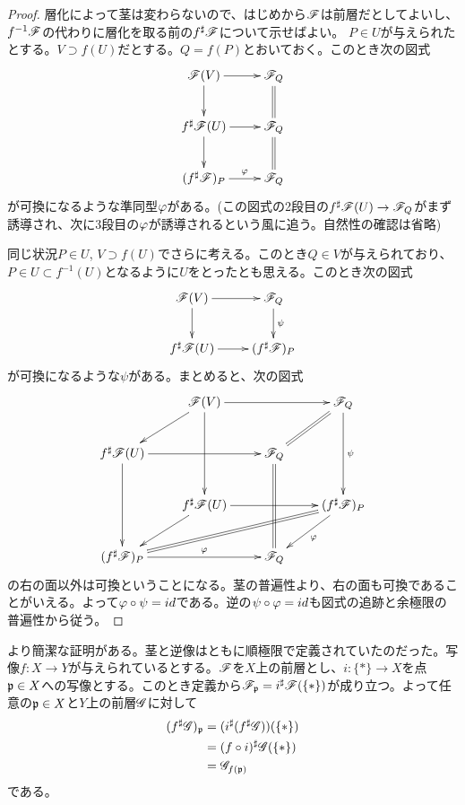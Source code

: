 \begin{proof}
  層化によって茎は変わらないので、はじめから$\mathscr{F}$は前層だとしてよいし、$f^{-1}\mathscr{F}$の代わりに層化を取る前の$f^{\sharp}\mathscr{F}$について示せばよい。
  $P \in U$が与えられたとする。$V \supset f(U)$だとする。$Q = f(P)$とおいておく。このとき次の図式
\[
\xymatrix{
\scrf(V) \ar[r] \ar[d] & \scrf_Q \ar@{=}[d] \\
f\sh\scrf(U) \ar[d] \ar[r] & \scrf_Q \ar@{=}[d] \\
(f\sh\scrf)_P \ar[r]^-{\vp} & \scrf_Q
}
\]
  が可換になるような準同型${\varphi}$がある。(この図式の2段目の$f^{\sharp}\mathscr{F}(U) \to \mathscr{F}_Q$がまず誘導され、次に3段目の${\varphi}$が誘導されるという風に追う。自然性の確認は省略)

  同じ状況$P \in U$, $V \supset f(U)$でさらに考える。このとき$Q \in V$が与えられており、$P \in U \subset f^{-1}(U)$となるように$U$をとったとも思える。このとき次の図式
  \[
  \xymatrix{
  \scrf(V) \ar[d] \ar[r] & \scrf_Q \ar[d]^-{\psi} \\
f\sh\scrf(U) \ar[r] & (f\sh\scrf)_P
  }
  \]
  が可換になるような$\psi$がある。まとめると、次の図式
  \[
  \xymatrix{
  {}  & \scrf(V) \ar[rr] \ar[ld] \ar[dd] & {} & \scrf_Q \ar@{=}[ld] \ar[dd]^-{\psi} \\
  f\sh\scrf(U) \ar[dd]  \ar[rr] & { } & \scrf_Q \ar@{=}[dd] & {} \\
  {} & f\sh\scrf(U)  \ar[rr] \ar[dl] & { } & (f\sh\scrf )_P \ar@{=}[dlll] \ar[dl]^-{\vp} \\
   (f\sh\scrf )_P  \ar[rr]^-{\vp}  & {} & \scrf_Q & {}
  }
  \]
  の右の面以外は可換ということになる。茎の普遍性より、右の面も可換であることがいえる。よって${\varphi} \circ \psi = id$である。逆の$\psi \circ {\varphi} = id$も図式の追跡と余極限の普遍性から従う。
\end{proof}

\begin{ano}
より簡潔な証明がある。茎と逆像はともに順極限で定義されていたのだった。写像$f \colon X \to Y$が与えられているとする。$\mathscr{F}$を$X$上の前層とし、$i \colon \{ * \} \to X$を点$\mathfrak{p} \in X$への写像とする。このとき定義から$\mathscr{F}_{\mathfrak{p}} = i^{\sharp}\mathscr{F}(\{*\})$が成り立つ。よって任意の$\mathfrak{p} \in X$と$Y$上の前層$\mathscr{G}$に対して
\begin{align*}
  (f^{\sharp}\mathscr{G})_{\mathfrak{p}} &= (i^{\sharp} (f^{\sharp}\mathscr{G}))(\{*\}) \\
  &= (f \circ i)^{\sharp} \mathscr{G} (\{*\}) \\
  &= \mathscr{G}_{f(\mathfrak{p})}
\end{align*}
である。

\end{ano}






